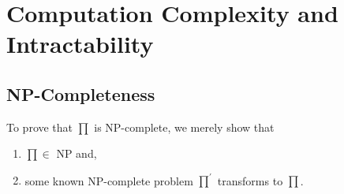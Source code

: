 \documentclass{article}
\begin{document}
\section{Computation Complexity and Intractability}

\subsection{NP-Completeness}

To prove that $\prod$ is NP-complete, we merely show that \cite{Garey:1990:CIG:574848}

\begin{enumerate}
\item $\prod \in$ NP and,
\item some known NP-complete problem $\prod^\prime$ transforms to $\prod$.
\end{enumerate}



\end{document}

